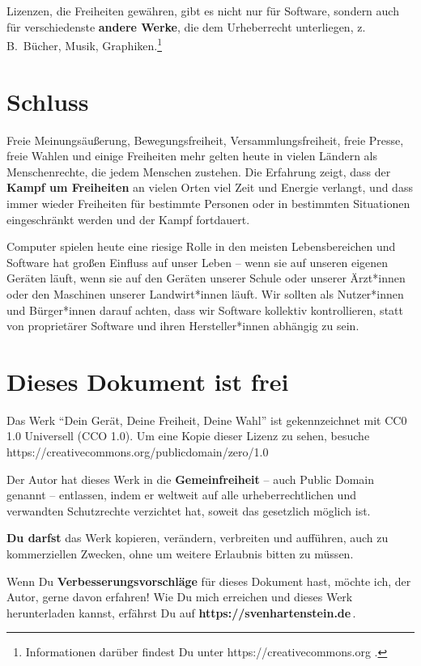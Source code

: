 \documentclass[a5paper,12pt]{scrartcl}
\begin{document}
Lizenzen, die Freiheiten gewähren, gibt es nicht nur für Software,
sondern auch für verschiedenste \textbf{andere Werke}, die dem
Urheberrecht unterliegen, z.\,B.\ Bücher, Musik,
Graphiken.\footnote{Informationen darüber findest Du unter
  https://creativecommons.org .}


\section{Schluss}

Freie Meinungsäußerung, Bewegungsfreiheit, Versammlungsfreiheit, freie
Presse, freie Wahlen und einige Freiheiten mehr gelten heute in vielen
Ländern als Menschenrechte, die jedem Menschen zustehen. Die Erfahrung
zeigt, dass der \textbf{Kampf um Freiheiten} an vielen Orten viel Zeit
und Energie verlangt, und dass immer wieder Freiheiten für bestimmte
Personen oder in bestimmten Situationen eingeschränkt werden und der
Kampf fortdauert.

Computer spielen heute eine riesige Rolle in den meisten
Lebensbereichen und Software hat großen Einfluss auf unser Leben --
wenn sie auf unseren eigenen Geräten läuft, wenn sie auf den Geräten
unserer Schule oder unserer Ärzt*innen oder den Maschinen unserer
Landwirt*innen läuft. Wir sollten als Nutzer*innen und Bürger*innen
darauf achten, dass wir Software kollektiv kontrollieren, statt von
proprietärer Software und ihren Hersteller*innen abhängig zu sein.


\section{Dieses Dokument ist frei}

Das Werk "`Dein Gerät, Deine Freiheit, Deine Wahl"' %
ist gekennzeichnet mit CC0 1.0 Universell (CCO
1.0). Um eine Kopie dieser Lizenz zu sehen,
besuche\\
https://creativecommons.org/publicdomain/zero/1.0

Der Autor hat dieses Werk in die \textbf{Gemeinfreiheit} -- auch
Public Domain genannt -- entlassen, indem er weltweit auf alle
urheberrechtlichen und verwandten Schutzrechte verzichtet hat, soweit
das gesetzlich möglich ist.

\textbf{Du darfst} das Werk kopieren, verändern, verbreiten und
aufführen, auch zu kommerziellen Zwecken, ohne um weitere Erlaubnis
bitten zu müssen.

Wenn Du \textbf{Verbesserungsvorschläge} für dieses Dokument hast,
möchte ich, der Autor, gerne davon erfahren! Wie Du mich erreichen und
dieses Werk herunterladen %
kannst, erfährst Du auf
\textbf{https://svenhartenstein.de}\,.
\end{document}
